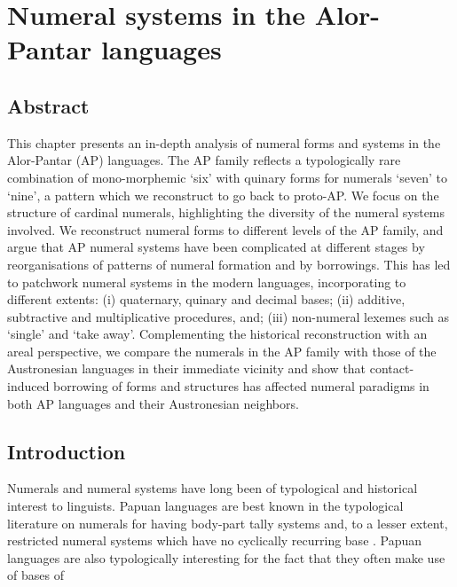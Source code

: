 
\chapter{Numeral systems in the Alor-Pantar languages}
\begin{figure}


\caption{}
\end{figure}

\section*{Abstract}This chapter presents an in-depth analysis of numeral forms and systems in the Alor-Pantar (AP) languages. The AP family reflects a typologically rare combination of mono-morphemic `six' with quinary forms for numerals `seven' to `nine', a pattern which we reconstruct to go back to proto-AP. We focus on the structure of cardinal numerals, highlighting the diversity of the numeral systems involved. We reconstruct numeral forms to different levels of the AP family, and argue that AP numeral systems have been complicated at different stages by reorganisations of patterns of numeral formation and by borrowings. This has led to patchwork numeral systems in the modern languages, incorporating to different extents: (i) quaternary, quinary and decimal bases; (ii) additive, subtractive and multiplicative procedures, and; (iii) non-numeral lexemes such as `single' and `take away'. Complementing the historical reconstruction with an areal perspective, we compare the numerals in the AP family with those of the Austronesian languages in their immediate vicinity and show that contact-induced borrowing of forms and structures has affected numeral paradigms in both AP languages and their Austronesian neighbors.

\section{Introduction}
\hypertarget{Toc376958477}{}Numerals and numeral systems have long been of typological and historical interest to linguists. Papuan languages are best known in the typological literature on numerals for having body-part tally systems and, to a lesser extent, restricted numeral systems which have no cyclically recurring base{} \citep{Laycock1975,Lean1992,Comrie2005numsym}. Papuan languages are also typologically interesting for the fact that they often make use of bases of 


